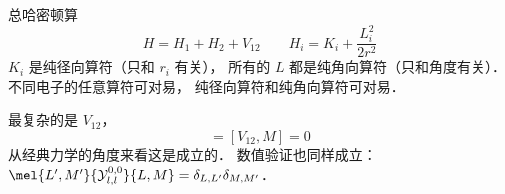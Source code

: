 
总哈密顿算
\begin{equation}
H = H_1 + H_2 + V_{12} \qquad H_i = K_i + \frac{L_i^2}{2r^2}
\end{equation}
$K_i$ 是纯径向算符（只和 $r_i$ 有关）， 所有的 $L$ 都是纯角向算符（只和角度有关）． 不同电子的任意算符可对易， 纯径向算符和纯角向算符可对易．

最复杂的是 $V_{12}$，
\begin{equation}
[V_{12}, L^2] = [V_{12}, M] = 0
\end{equation}
从经典力学的角度来看这是成立的． 数值验证也同样成立： $\mel{L',M'}{\mathcal Y_{l,l}^{0,0}}{L,M} = \delta_{L,L'}\delta_{M,M'}$．
